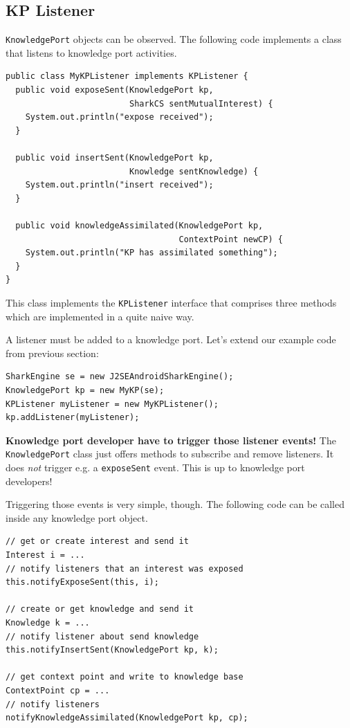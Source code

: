 \subsection{KP Listener}
{\tt KnowledgePort} objects can be observed. The following code implements a class that listens to knowledge port activities.

\begin{verbatim}
public class MyKPListener implements KPListener {
  public void exposeSent(KnowledgePort kp, 
                         SharkCS sentMutualInterest) {
    System.out.println("expose received");
  }

  public void insertSent(KnowledgePort kp, 
                         Knowledge sentKnowledge) {
    System.out.println("insert received");
  }

  public void knowledgeAssimilated(KnowledgePort kp, 
                                   ContextPoint newCP) {
    System.out.println("KP has assimilated something");
  }
}
\end{verbatim}

This class implements the {\tt KPListener} interface that comprises three methods which are implemented in a quite naive way.

A listener must be added to a knowledge port. Let's extend our example code from previous section:

\begin{verbatim}
SharkEngine se = new J2SEAndroidSharkEngine();
KnowledgePort kp = new MyKP(se);
KPListener myListener = new MyKPListener();
kp.addListener(myListener);
\end{verbatim}

{\bf Knowledge port developer have to trigger those listener events!} The {\tt KnowledgePort} class just offers methods to subscribe and remove listeners.
It does {\it not} trigger e.g. a {\tt exposeSent} event. This is up to knowledge port developers!

Triggering those events is very simple, though. The following code can be  called inside any knowledge port object.

\begin{verbatim}
// get or create interest and send it
Interest i = ...
// notify listeners that an interest was exposed
this.notifyExposeSent(this, i);

// create or get knowledge and send it
Knowledge k = ...
// notify listener about send knowledge
this.notifyInsertSent(KnowledgePort kp, k);

// get context point and write to knowledge base
ContextPoint cp = ...
// notify listeners
notifyKnowledgeAssimilated(KnowledgePort kp, cp);
\end{verbatim}

